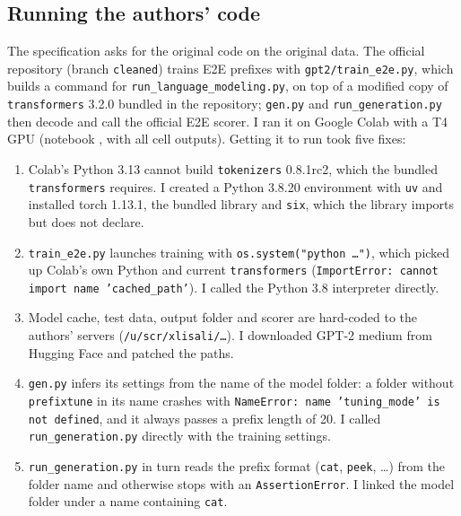 \documentclass[11pt]{article}
\begin{document}
\subsection{Running the authors' code}\label{sec:authors}
The specification asks for the original code on the original data. The official repository (branch \texttt{cleaned}) trains E2E prefixes with \texttt{gpt2/train\_e2e.py}, which builds a command for \texttt{run\_language\_modeling.py}, on top of a modified copy of \texttt{transformers} 3.2.0 bundled in the repository; \texttt{gen.py} and \texttt{run\_generation.py} then decode and call the official E2E scorer. I ran it on Google Colab with a T4 GPU (notebook , with all cell outputs). Getting it to run took five fixes:
{\sloppy
\begin{enumerate}\setlength\itemsep{0pt}
\item Colab's Python 3.13 cannot build \texttt{tokenizers} 0.8.1rc2, which the bundled \texttt{transformers} requires. I created a Python 3.8.20 environment with \texttt{uv} and installed torch 1.13.1, the bundled library and \texttt{six}, which the library imports but does not declare.
\item \texttt{train\_e2e.py} launches training with \texttt{os.system("python \dots")}, which picked up Colab's own Python and current \texttt{transformers} (\texttt{ImportError: cannot import name 'cached\_path'}). I called the Python 3.8 interpreter directly.
\item Model cache, test data, output folder and scorer are hard-coded to the authors' servers (\texttt{/u/scr/xlisali/\dots}). I downloaded GPT-2 medium from Hugging Face and patched the paths.
\item \texttt{gen.py} infers its settings from the name of the model folder: a folder without \texttt{prefixtune} in its name crashes with \texttt{NameError: name 'tuning\_mode' is not defined}, and it always passes a prefix length of 20. I called \texttt{run\_generation.py} directly with the training settings.
\item \texttt{run\_generation.py} in turn reads the prefix format (\texttt{cat}, \texttt{peek}, \dots) from the folder name and otherwise stops with an \texttt{AssertionError}. I linked the model folder under a name containing \texttt{cat}.
\end{enumerate}
}
\end{document}
